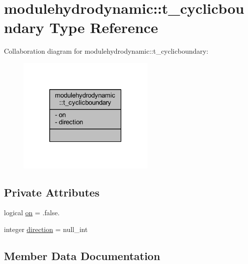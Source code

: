 \hypertarget{structmodulehydrodynamic_1_1t__cyclicboundary}{}\section{modulehydrodynamic\+:\+:t\+\_\+cyclicboundary Type Reference}
\label{structmodulehydrodynamic_1_1t__cyclicboundary}


Collaboration diagram for modulehydrodynamic\+:\+:t\+\_\+cyclicboundary\+:\nopagebreak
\begin{figure}[H]
\begin{center}
\leavevmode
\includegraphics[width=189pt]{structmodulehydrodynamic_1_1t__cyclicboundary__coll__graph}
\end{center}
\end{figure}
\subsection*{Private Attributes}
\begin{DoxyCompactItemize}
\item 
logical \mbox{\hyperlink{structmodulehydrodynamic_1_1t__cyclicboundary_a92406306fb56d8addb88bf790e431497}{on}} = .false.
\item 
integer \mbox{\hyperlink{structmodulehydrodynamic_1_1t__cyclicboundary_a7e14b90cd68eacf99746203d08420f6e}{direction}} = null\+\_\+int
\end{DoxyCompactItemize}


\subsection{Member Data Documentation}
\mbox{\label{structmodulehydrodynamic_1_1t__cyclicboundary_a7e14b90cd68eacf99746203d08420f6e}} 
